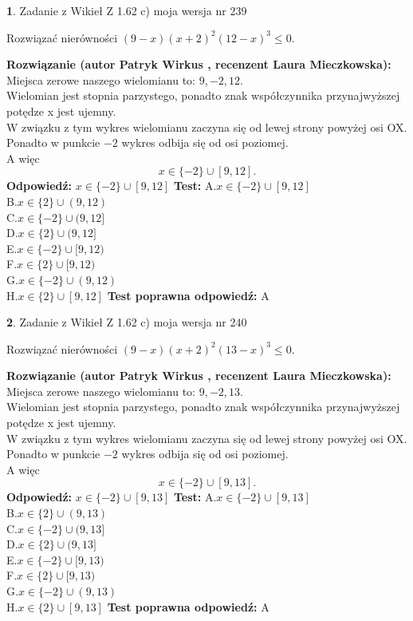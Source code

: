 \documentclass[12pt, a4paper]{article}
\theoremstyle{definition} %
\newtheorem{zad}{}
\newcommand{\zadStart}[1]{\begin{zad}#1\newline}
\newcommand{\zadStop}{\end{zad}}
\newcommand{\rozwStart}[2]{\noindent \textbf{Rozwiązanie (autor #1 , recenzent #2): }\newline}
\newcommand{\rozwStop}{\newline}
\newcommand{\odpStart}{\noindent \textbf{Odpowiedź:}\newline}
\newcommand{\odpStop}{\newline}
\newcommand{\testStart}{\noindent \textbf{Test:}\newline}
\newcommand{\testStop}{\newline}
\newcommand{\kluczStart}{\noindent \textbf{Test poprawna odpowiedź:}\newline}
\newcommand{\kluczStop}{\newline}
\begin{document}
\zadStart{Zadanie z Wikieł Z 1.62 c) moja wersja nr 239}

Rozwiązać nierówności $(9-x)(x+2)^{2}(12-x)^{3}\le0$.
\zadStop
\rozwStart{Patryk Wirkus}{Laura Mieczkowska}
Miejsca zerowe naszego wielomianu to: $9, -2, 12$.\\
Wielomian jest stopnia parzystego, ponadto znak współczynnika przy\linebreak najwyższej potędze x jest ujemny.\\ W związku z tym wykres wielomianu zaczyna się od lewej strony powyżej osi OX.\\
Ponadto w punkcie $-2$ wykres odbija się od osi poziomej.\\
A więc $$x \in \{-2\} \cup [9,12].$$
\rozwStop
\odpStart
$x \in \{-2\} \cup [9,12]$
\odpStop
\testStart
A.$x \in \{-2\} \cup [9,12]$\\
B.$x \in \{2\} \cup (9,12)$\\
C.$x \in \{-2\} \cup (9,12]$\\
D.$x \in \{2\} \cup (9,12]$\\
E.$x \in \{-2\} \cup [9,12)$\\
F.$x \in \{2\} \cup [9,12)$\\
G.$x \in \{-2\} \cup (9,12)$\\
H.$x \in \{2\} \cup [9,12]$
\testStop
\kluczStart
A
\kluczStop



\zadStart{Zadanie z Wikieł Z 1.62 c) moja wersja nr 240}

Rozwiązać nierówności $(9-x)(x+2)^{2}(13-x)^{3}\le0$.
\zadStop
\rozwStart{Patryk Wirkus}{Laura Mieczkowska}
Miejsca zerowe naszego wielomianu to: $9, -2, 13$.\\
Wielomian jest stopnia parzystego, ponadto znak współczynnika przy\linebreak najwyższej potędze x jest ujemny.\\ W związku z tym wykres wielomianu zaczyna się od lewej strony powyżej osi OX.\\
Ponadto w punkcie $-2$ wykres odbija się od osi poziomej.\\
A więc $$x \in \{-2\} \cup [9,13].$$
\rozwStop
\odpStart
$x \in \{-2\} \cup [9,13]$
\odpStop
\testStart
A.$x \in \{-2\} \cup [9,13]$\\
B.$x \in \{2\} \cup (9,13)$\\
C.$x \in \{-2\} \cup (9,13]$\\
D.$x \in \{2\} \cup (9,13]$\\
E.$x \in \{-2\} \cup [9,13)$\\
F.$x \in \{2\} \cup [9,13)$\\
G.$x \in \{-2\} \cup (9,13)$\\
H.$x \in \{2\} \cup [9,13]$
\testStop
\kluczStart
A
\kluczStop
\end{document}
